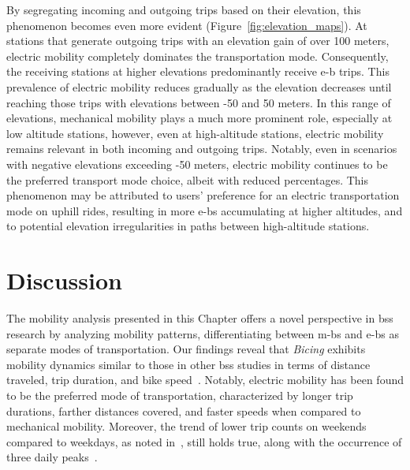 By segregating incoming and outgoing trips based on their elevation, this phenomenon becomes even more evident (Figure~\ref{fig:elevation_maps}). At stations that generate outgoing trips with an elevation gain of over 100 meters, electric mobility completely dominates the transportation mode. Consequently, the receiving stations at higher elevations predominantly receive \ac{e-b} trips. This prevalence of electric mobility reduces gradually as the elevation decreases until reaching those trips with elevations between -50 and 50 meters. In this range of elevations, mechanical mobility plays a much more prominent role, especially at low altitude stations, however, even at high-altitude stations, electric mobility remains relevant in both incoming and outgoing trips. Notably, even in scenarios with negative elevations exceeding -50 meters, electric mobility continues to be the preferred transport mode choice, albeit with reduced percentages. This phenomenon may be attributed to users' preference for an electric transportation mode on uphill rides, resulting in more \acp{e-b} accumulating at higher altitudes, and to potential elevation irregularities in paths between high-altitude stations.

\section{Discussion}

The mobility analysis presented in this Chapter offers a novel perspective in \ac{bss} research by analyzing mobility patterns, differentiating between \acp{m-b} and \acp{e-b} as separate modes of transportation. Our findings reveal that \textit{Bicing} exhibits mobility dynamics similar to those in other \ac{bss} studies in terms of distance traveled, trip duration, and bike speed~\cite{Jensen2010, Ciancia2015, Zaltz2013, Chiariotti2018, Borgnat2011, Zhang2016Bicycle}. Notably, electric mobility has been found to be the preferred mode of transportation, characterized by longer trip durations, farther distances covered, and faster speeds when compared to mechanical mobility. Moreover, the trend of lower trip counts on weekends compared to weekdays, as noted in~\cite{Froehlich2009, Bustamante2022}, still holds true, along with the occurrence of three daily peaks~\cite{Froehlich2009}. 

